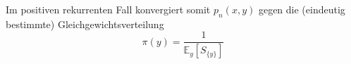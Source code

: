 Im positiven rekurrenten Fall konvergiert somit $p_{n}(x,y)$ gegen die (eindeutig bestimmte) Gleichgewichtsverteilung 
\begin{equation*}
\pi(y) = \dfrac{1}{\mathbb{E}_{y}[S_{\lbrace y \rbrace}]}
\end{equation*}